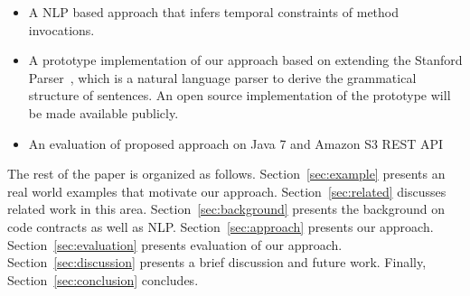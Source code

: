 \begin{itemize}
	\item A NLP based approach that infers temporal constraints of method invocations.
	\item A prototype implementation of our approach based on extending the Stanford Parser~\cite{Klein03,SNLP1}, which is a natural language parser to derive the grammatical structure of sentences.
	An open source implementation of the prototype will be made available publicly. 
	\item An evaluation of proposed approach on Java 7 and Amazon S3 REST API
\end{itemize}


The rest of the paper is organized as follows.
Section~\ref{sec:example} presents an real world examples that motivate our approach.
Section~\ref{sec:related} discusses related work in this area.
Section~\ref{sec:background} presents the  background on code contracts as well as NLP.
Section~\ref{sec:approach} presents our approach.
Section~\ref{sec:evaluation} presents evaluation of our approach.
Section~\ref{sec:discussion} presents a brief discussion and future work.
Finally, Section~\ref{sec:conclusion} concludes.


